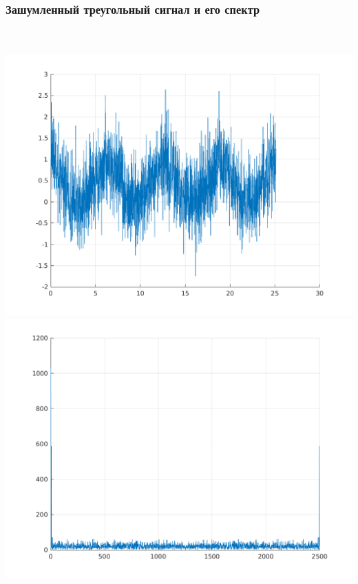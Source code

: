 \documentclass[a4paper]{article}
\begin{document}
\subsubsection{Зашумленный треугольный сигнал и его спектр}\\
\\
\includegraphics[scale=0.7]{lab3/figures/figure_14.png}\\
\includegraphics[scale=0.7]{lab3/figures/figure_15.png}\\
\end{document}
